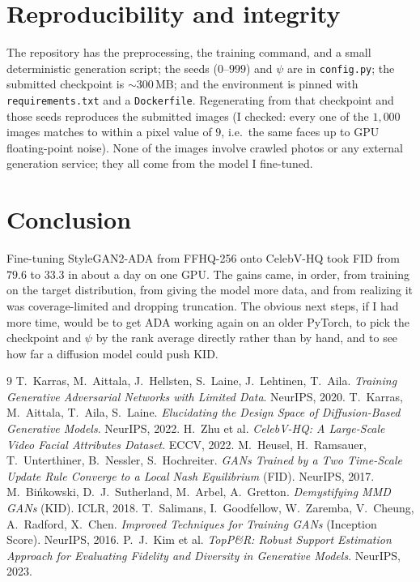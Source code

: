 \documentclass{article}
\begin{document}
\section{Reproducibility and integrity}
The repository has the preprocessing, the training command, and a small deterministic generation script;
the seeds ($0$--$999$) and $\psi$ are in \texttt{config.py}; the submitted checkpoint is ${\sim}300$\,MB;
and the environment is pinned with \texttt{requirements.txt} and a \texttt{Dockerfile}. Regenerating from
that checkpoint and those seeds reproduces the submitted images (I checked: every one of the $1{,}000$
images matches to within a pixel value of $9$, i.e.\ the same faces up to GPU floating-point noise). None
of the images involve crawled photos or any external generation service; they all come from the model I
fine-tuned.

\section{Conclusion}
Fine-tuning StyleGAN2-ADA from FFHQ-256 onto CelebV-HQ took FID from $79.6$ to $33.3$ in about a day on one
GPU. The gains came, in order, from training on the target distribution, from giving the model more data,
and from realizing it was coverage-limited and dropping truncation. The obvious next steps, if I had more
time, would be to get ADA working again on an older PyTorch, to pick the checkpoint and $\psi$ by the rank
average directly rather than by hand, and to see how far a diffusion model could push KID.

\begin{thebibliography}{9}
 T.~Karras, M.~Aittala, J.~Hellsten, S.~Laine, J.~Lehtinen, T.~Aila.
\emph{Training Generative Adversarial Networks with Limited Data}. NeurIPS, 2020.
 T.~Karras, M.~Aittala, T.~Aila, S.~Laine.
\emph{Elucidating the Design Space of Diffusion-Based Generative Models}. NeurIPS, 2022.
 H.~Zhu et al.
\emph{CelebV-HQ: A Large-Scale Video Facial Attributes Dataset}. ECCV, 2022.
 M.~Heusel, H.~Ramsauer, T.~Unterthiner, B.~Nessler, S.~Hochreiter.
\emph{GANs Trained by a Two Time-Scale Update Rule Converge to a Local Nash Equilibrium} (FID).
NeurIPS, 2017.
 M.~Bi\'nkowski, D.~J.~Sutherland, M.~Arbel, A.~Gretton.
\emph{Demystifying MMD GANs} (KID). ICLR, 2018.
 T.~Salimans, I.~Goodfellow, W.~Zaremba, V.~Cheung, A.~Radford, X.~Chen.
\emph{Improved Techniques for Training GANs} (Inception Score). NeurIPS, 2016.
 P.~J.~Kim et al.
\emph{TopP\&R: Robust Support Estimation Approach for Evaluating Fidelity and Diversity in Generative
Models}. NeurIPS, 2023.
\end{thebibliography}
\end{document}
